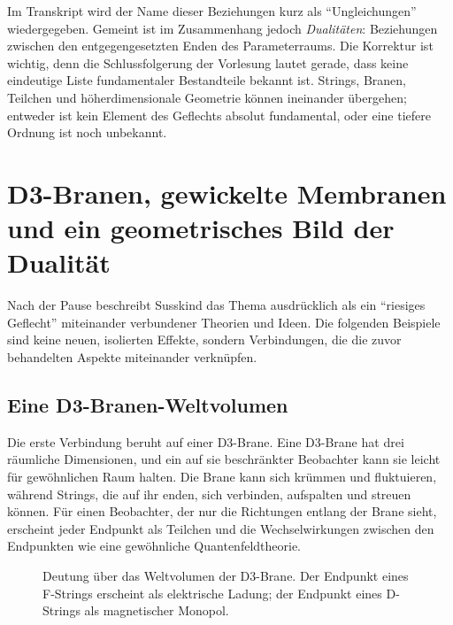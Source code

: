 Im Transkript wird der Name dieser Beziehungen kurz als ``Ungleichungen'' wiedergegeben. Gemeint ist im Zusammenhang jedoch \emph{Dualitäten}: Beziehungen zwischen den entgegengesetzten Enden des Parameterraums. Die Korrektur ist wichtig, denn die Schlussfolgerung der Vorlesung lautet gerade, dass keine eindeutige Liste fundamentaler Bestandteile bekannt ist. Strings, Branen, Teilchen und höherdimensionale Geometrie können ineinander übergehen; entweder ist kein Element des Geflechts absolut fundamental, oder eine tiefere Ordnung ist noch unbekannt.

\section{D3-Branen, gewickelte Membranen und ein geometrisches Bild der Dualität}

Nach der Pause beschreibt Susskind das Thema ausdrücklich als ein ``riesiges Geflecht'' miteinander verbundener Theorien und Ideen. Die folgenden Beispiele sind keine neuen, isolierten Effekte, sondern Verbindungen, die die zuvor behandelten Aspekte miteinander verknüpfen.

\subsection{Eine D3-Branen-Weltvolumen}

Die erste Verbindung beruht auf einer D3-Brane. Eine D3-Brane hat drei räumliche Dimensionen, und ein auf sie beschränkter Beobachter kann sie leicht für gewöhnlichen Raum halten. Die Brane kann sich krümmen und fluktuieren, während Strings, die auf ihr enden, sich verbinden, aufspalten und streuen können. Für einen Beobachter, der nur die Richtungen entlang der Brane sieht, erscheint jeder Endpunkt als Teilchen und die Wechselwirkungen zwischen den Endpunkten wie eine gewöhnliche Quantenfeldtheorie.

\begin{figure}[htbp]
\centering
{}%
\caption{Deutung über das Weltvolumen der D3-Brane. Der Endpunkt eines F-Strings erscheint als elektrische Ladung; der Endpunkt eines D-Strings als magnetischer Monopol.}
\end{figure}

